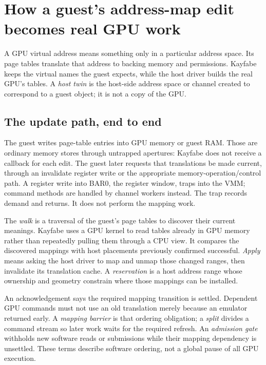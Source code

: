 \section{How a guest's address-map edit becomes real GPU work}
\label{sec:primer}

A GPU virtual address means something only in a particular address space. Its page tables
translate that address to backing memory and permissions. Kayfabe keeps the virtual names the
guest expects, while the host driver builds the real GPU's tables. A \emph{host twin} is the
host-side address space or channel created to correspond to a guest object; it is not a copy
of the GPU.

\subsection{The update path, end to end}

\doc The guest writes page-table entries into GPU memory or guest RAM. Those are ordinary
memory stores through untrapped apertures: Kayfabe does not receive a callback for each edit.
The guest later requests that translations be made current, through an invalidate register
write or the appropriate memory-operation/control path. A register write into BAR0, the
register window, traps into the VMM; command methods are handled by channel workers instead.
The trap records demand and returns. It does not perform the mapping work.

The \emph{walk} is a traversal of the guest's page tables to discover their current meanings.
Kayfabe uses a GPU kernel to read tables already in GPU memory rather than repeatedly pulling
them through a CPU view. It compares the discovered mappings with host placements previously
confirmed successful. \emph{Apply} means asking the host driver to map and unmap those changed
ranges, then invalidate its translation cache. A \emph{reservation} is a host address range
whose ownership and geometry constrain where those mappings can be installed.

An acknowledgement says the required mapping transition is settled. Dependent GPU commands
must not use an old translation merely because an emulator returned early. A
\emph{mapping barrier} is that ordering obligation; a \emph{split} divides a command stream
so later work waits for the required refresh. An \emph{admission gate} withholds new software
reads or submissions while their mapping dependency is unsettled. These terms describe
software ordering, not a global pause of all GPU execution.

